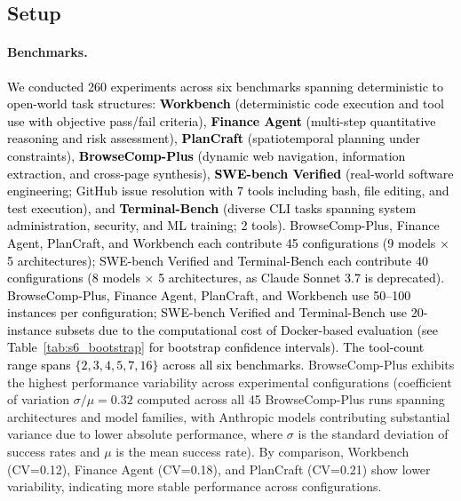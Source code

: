   
  
  
  
\subsection{Setup}
  
\paragraph{Benchmarks.}
\textcolor{black}{We conducted 260 experiments across six benchmarks spanning deterministic to open-world task structures: \textbf{Workbench} (deterministic code execution and tool use with objective pass/fail criteria), \textbf{Finance Agent} (multi-step quantitative reasoning and risk assessment), \textbf{PlanCraft} (spatiotemporal planning under constraints), \textbf{BrowseComp-Plus} (dynamic web navigation, information extraction, and cross-page synthesis), \textbf{SWE-bench Verified} (real-world software engineering; GitHub issue resolution with 7 tools including bash, file editing, and test execution), and \textbf{Terminal-Bench} (diverse CLI tasks spanning system administration, security, and ML training; 2 tools). BrowseComp-Plus, Finance Agent, PlanCraft, and Workbench each contribute 45 configurations (9 models $\times$ 5 architectures); SWE-bench Verified and Terminal-Bench each contribute 40 configurations (8 models $\times$ 5 architectures, as Claude Sonnet 3.7 is deprecated). BrowseComp-Plus, Finance Agent, PlanCraft, and Workbench use 50--100 instances per configuration; SWE-bench Verified and Terminal-Bench use 20-instance subsets due to the computational cost of Docker-based evaluation (see Table~\ref{tab:s6_bootstrap} for bootstrap confidence intervals). The tool-count range spans $\{2,3,4,5,7,16\}$ across all six benchmarks.} BrowseComp-Plus exhibits the highest performance variability across experimental configurations (coefficient of variation $\sigma/\mu= 0.32$ computed across all 45 BrowseComp-Plus runs spanning architectures and model families, with Anthropic models contributing substantial variance due to lower absolute performance, where $\sigma$ is the standard deviation of success rates and $\mu$ is the mean success rate). By comparison, Workbench (CV=0.12), Finance Agent (CV=0.18), and PlanCraft (CV=0.21) show lower variability, indicating more stable performance across configurations. 
  
  
